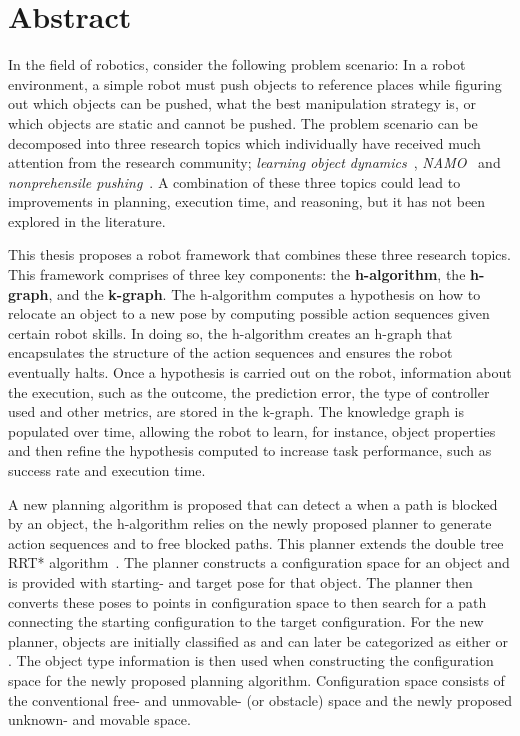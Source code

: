 \chapter*{Abstract}
In the field of robotics, consider the following problem scenario: In a robot environment, a simple robot must push objects to reference places while figuring out which objects can be pushed, what the best manipulation strategy is, or which objects are static and cannot be pushed. The problem scenario can be decomposed into three research topics which individually have received much attention from the research community; \textit{learning object dynamics}~\cite{cong_selfadapting_2020,seegmiller_vehicle_2013}, \textit{\acf{NAMO}}~\cite{chen_fast_2018,elbanhawi_samplingbased_2014,kingston_samplingbased_2018,lavalle_planning_2006} and \textit{nonprehensile pushing}~\cite{arruda_uncertainty_2017,bauza_dataefficient_2018,mericli_pushmanipulation_2015,stuber_featurebased_2018,stuber_let_2020,toussaint_sequenceofconstraints_2022}. A combination of these three topics could lead to improvements in planning, execution time, and reasoning, but it has not been explored in the literature.\bs

This thesis proposes a robot framework that combines these three research topics. This framework comprises of three key components: the \textbf{\acl{h-algorithm}}, the \textbf{\acl{h-graph}}, and the \textbf{\acl{k-graph}}. The \acl{h-algorithm} computes a hypothesis on how to relocate an object to a new pose by computing possible action sequences given certain robot skills. In doing so, the \acl{h-algorithm} creates an \acl{h-graph} that encapsulates the structure of the action sequences and ensures the robot eventually halts. Once a hypothesis is carried out on the robot, information about the execution, such as the outcome, the prediction error, the type of controller used and other metrics, are stored in the \acl{k-graph}. The knowledge graph is populated over time, allowing the robot to learn, for instance, object properties and then refine the hypothesis computed to increase task performance, such as success rate and execution time.\bs

A new planning algorithm is proposed that can detect a when a path is blocked by an object, the \acl{h-algorithm} relies on the newly proposed planner to generate action sequences and to free blocked paths. This planner extends the double tree \acl{RRT*} algorithm~\cite{chen_fast_2018}. The planner constructs a configuration space for an object and is provided with starting- and target pose for that object. The planner then converts these poses to points in configuration space to then search for a path connecting the starting configuration to the target configuration. For the new planner, objects are initially classified as  and can later be categorized as either  or . The object type information is then used when constructing the configuration space for the newly proposed planning algorithm. Configuration space consists of the conventional free- and unmovable- (or obstacle) space and the newly proposed unknown- and movable space.\bs

